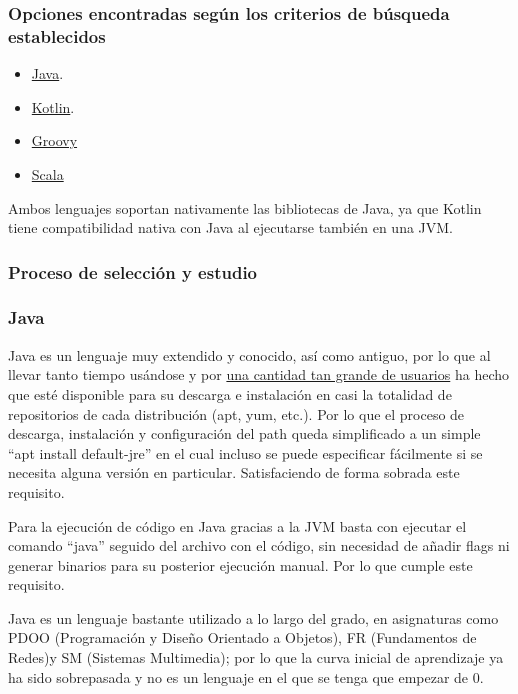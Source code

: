 \subsubsection{Opciones encontradas según los criterios de búsqueda establecidos}

\begin{itemize}
    \item \href{https://www.java.com/es/}{Java}.
    \item \href{https://kotlinlang.org/}{Kotlin}.
    \item \href{https://groovy-lang.org/}{Groovy}
    \item \href{https://www.scala-lang.org/}{Scala}
\end{itemize}

Ambos lenguajes soportan nativamente las bibliotecas de Java, ya que Kotlin tiene
compatibilidad nativa con Java al ejecutarse también en una JVM.

\subsubsection{Proceso de selección y estudio}

\subsubsection{Java}

\begin{todolist}
    \item[\xcmark] Java es un lenguaje muy extendido y conocido, así como
    antiguo, por lo que al llevar tanto tiempo usándose y por
    \href{https://www.stackscale.com/es/blog/lenguajes-programacion-mas-populares/}{una
    cantidad tan grande de usuarios} ha hecho que esté disponible para su
    descarga e instalación en casi la totalidad de repositorios de cada
    distribución (apt, yum, etc.). Por lo que el proceso de descarga, instalación
    y configuración del path queda simplificado a un simple ``apt install
    default-jre'' en el cual incluso se puede especificar fácilmente si se
    necesita alguna versión en particular. Satisfaciendo de forma sobrada este
    requisito.
    \item[\xcmark] Para la ejecución de código en Java gracias a la JVM basta
    con ejecutar el comando ``java'' seguido del archivo con el código, sin
    necesidad de añadir flags ni generar binarios para su posterior ejecución
    manual. Por lo que cumple este requisito.
    \item[\xcmark] Java es un lenguaje bastante utilizado a lo largo del grado,
    en asignaturas como PDOO (Programación y Diseño Orientado a Objetos), FR
    (Fundamentos de Redes)y SM (Sistemas Multimedia); por lo que la curva
    inicial de aprendizaje ya ha sido sobrepasada y no es un lenguaje en el que
    se tenga que empezar de 0.
\end{todolist}

